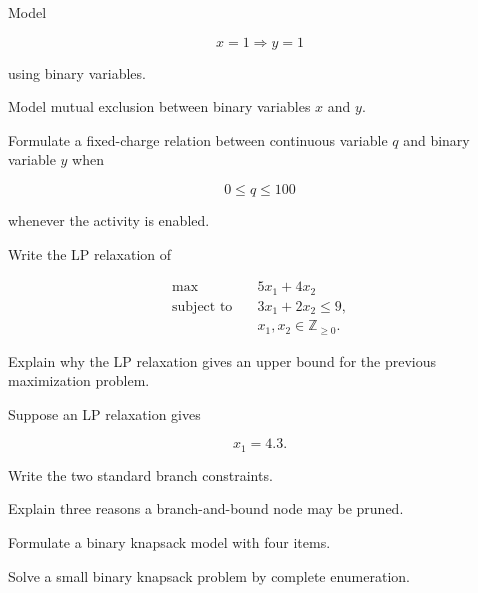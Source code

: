 \begin{exercise}[2]
Model

\[
x=1
\Rightarrow
y=1
\]

using binary variables.
\end{exercise}

\begin{exercise}[2]
Model mutual exclusion between binary variables \(x\) and \(y\).
\end{exercise}

\begin{exercise}[2]
Formulate a fixed-charge relation between continuous variable \(q\) and
binary variable \(y\) when

\[
0\leq q\leq100
\]

whenever the activity is enabled.
\end{exercise}

\begin{exercise}[2]
Write the LP relaxation of

\[
\begin{aligned}
\max\quad&
5x_1+4x_2
\\
\text{subject to}\quad&
3x_1+2x_2\leq9,
\\
&
x_1,x_2\in\mathbb{Z}_{\geq0}.
\end{aligned}
\]
\end{exercise}

\begin{exercise}[2]
Explain why the LP relaxation gives an upper bound for the previous
maximization problem.
\end{exercise}

\begin{exercise}[2]
Suppose an LP relaxation gives

\[
x_1=4.3.
\]

Write the two standard branch constraints.
\end{exercise}

\begin{exercise}[2]
Explain three reasons a branch-and-bound node may be pruned.
\end{exercise}

\begin{exercise}[3]
Formulate a binary knapsack model with four items.
\end{exercise}

\begin{exercise}[3]
Solve a small binary knapsack problem by complete enumeration.
\end{exercise}

